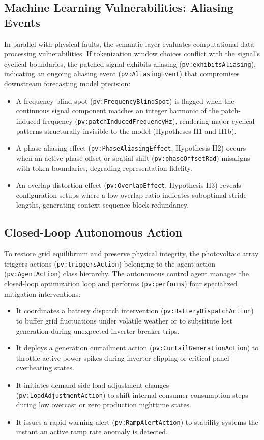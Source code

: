 \subsection{Machine Learning Vulnerabilities: Aliasing Events}
In parallel with physical faults, the semantic layer evaluates computational data-processing vulnerabilities. If tokenization window choices conflict with the signal's cyclical boundaries, the patched signal exhibits aliasing (\texttt{pv:exhibitsAliasing}), indicating an ongoing aliasing event (\texttt{pv:AliasingEvent}) that compromises downstream forecasting model precision:
\begin{itemize}
    \item A frequency blind spot (\texttt{pv:FrequencyBlindSpot}) is flagged when the continuous signal component matches an integer harmonic of the patch-induced frequency (\texttt{pv:patchInducedFrequencyHz}), rendering major cyclical patterns structurally invisible to the model (Hypotheses H1 and H1b).
    \item A phase aliasing effect (\texttt{pv:PhaseAliasingEffect}, Hypothesis H2) occurs when an active phase offset or spatial shift (\texttt{pv:phaseOffsetRad}) misaligns with token boundaries, degrading representation fidelity.
    \item An overlap distortion effect (\texttt{pv:OverlapEffect}, Hypothesis H3) reveals configuration setups where a low overlap ratio indicates suboptimal stride lengths, generating context sequence block redundancy.
\end{itemize}

\subsection{Closed-Loop Autonomous Action}
To restore grid equilibrium and preserve physical integrity, the photovoltaic array triggers actions (\texttt{pv:triggersAction}) belonging to the agent action (\texttt{pv:AgentAction}) class hierarchy. The autonomous control agent manages the closed-loop optimization loop and performs (\texttt{pv:performs}) four specialized mitigation interventions:
\begin{itemize}
    \item It coordinates a battery dispatch intervention (\texttt{pv:BatteryDispatchAction}) to buffer grid fluctuations under volatile weather or to substitute lost generation during unexpected inverter breaker trips.
    \item It deploys a generation curtailment action (\texttt{pv:CurtailGenerationAction}) to throttle active power spikes during inverter clipping or critical panel overheating states.
    \item It initiates demand side load adjustment changes (\texttt{pv:LoadAdjustmentAction}) to shift internal consumer consumption steps during low overcast or zero production nighttime states.
    \item It issues a rapid warning alert (\texttt{pv:RampAlertAction}) to stability systems the instant an active ramp rate anomaly is detected.
\end{itemize}